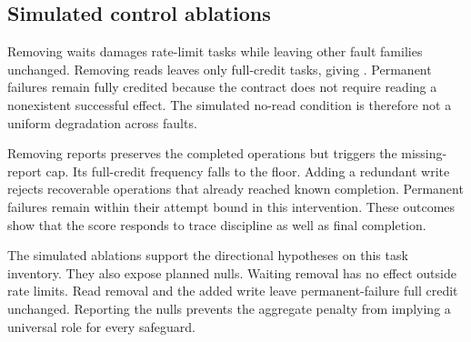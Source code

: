 \documentclass{article}
\begin{document}
\subsection{Simulated control ablations}
Removing waits damages rate-limit tasks while leaving other fault families unchanged. Removing reads leaves only \NoReadCount{} full-credit tasks, giving \FullNoRead{}. Permanent failures remain fully credited because the contract does not require reading a nonexistent successful effect. The simulated no-read condition is therefore not a uniform degradation across faults.\par

Removing reports preserves the completed operations but triggers the missing-report cap. Its full-credit frequency falls to the floor. Adding a redundant write rejects recoverable operations that already reached known completion. Permanent failures remain within their attempt bound in this intervention. These outcomes show that the score responds to trace discipline as well as final completion.\par
\begin{table}[ht]\centering\small\caption{Simulated paired ablation effects relative to the privileged reference. Bootstrap intervals preserve fault composition. Collapsed intervals reflect constant within-family scores.}\label{tab:contrasts}\end{table}
The simulated ablations support the directional hypotheses on this task inventory. They also expose planned nulls. Waiting removal has no effect outside rate limits. Read removal and the added write leave permanent-failure full credit unchanged. Reporting the nulls prevents the aggregate penalty from implying a universal role for every safeguard.\par
\begin{table}[ht]\centering\scriptsize\caption{Fault-specific full-credit frequencies for simulated ablations, with \CiLevel\% Wilson intervals. Each column uses identical tasks.}\label{tab:faults}\end{table}
\end{document}
